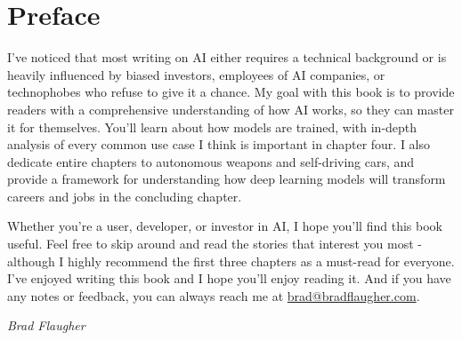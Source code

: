 \let\cleardoublepage\clearpage
\chapter*{Preface}

I've noticed that most writing on AI either requires a technical background or is heavily influenced by biased investors, employees of AI companies, or technophobes who refuse to give it a chance. My goal with this book is to provide readers with a comprehensive understanding of how AI works, so they can master it for themselves. You'll learn about how models are trained, with in-depth analysis of every common use case I think is important in chapter four. I also dedicate entire chapters to autonomous weapons and self-driving cars, and provide a framework for understanding how deep learning models will transform careers and jobs in the concluding chapter.

Whether you're a user, developer, or investor in AI, I hope you'll find this book useful. Feel free to skip around and read the stories that interest you most - although I highly recommend the first three chapters as a must-read for everyone. I've enjoyed writing this book and I hope you'll enjoy reading it. And if you have any notes or feedback, you can always reach me at \href{mailto:brad@bradflaugher.com}{brad@bradflaugher.com}.

\begin{flushright}
	\textit{Brad Flaugher}
\end{flushright}

